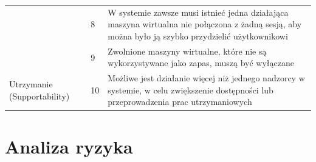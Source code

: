 \documentclass[12pt]{article}
\begin{document}
\begin{center}
\begin{table}[h!]
\begin{tabular}{|p{}|p{}|p{}|}
			                                                & 8            & W systemie zawsze musi istnieć jedna działająca maszyna wirtualna nie połączona z żadną sesją, aby można było ją szybko przydzielić użytkownikowi                       \\ \cline{2-3}
			                                                & 9            & Zwolnione maszyny wirtualne, które nie są wykorzystywane jako zapas, muszą być wyłączane                                                                                \\ \hline
			\multirow[t]{3}{=}{Utrzymanie (Supportability)} & 10           & Możliwe jest działanie więcej niż jednego nadzorcy w systemie, w celu zwiększenie dostępności lub przeprowadzenia prac utrzymaniowych                                   \\
			\hline
		\end{tabular}
	\end{table}
\end{center}

\newpage

\section{Analiza ryzyka}
\end{document}
